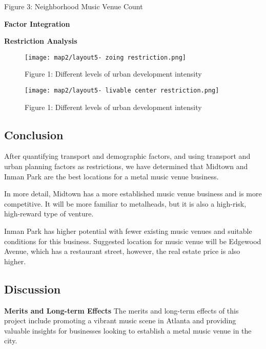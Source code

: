 \documentclass[11pt]{article}
\begin{document}
\begin{center}
\centering
Figure 3: Neighborhood Music Venue Count
\end{center}


\textbf{Factor Integration}


\textbf{Restriction Analysis}

\begin{figure}[H]
\begin{center}
\centering
\texttt{[image: map2/layout5- zoing restriction.png]}
\caption{Figure 1: Different levels of urban development intensity}
\label{fig:figure1}
\end{center}
\end{figure}

\begin{figure}[H]
\begin{center}
\centering
\texttt{[image: map2/layout5- livable center restriction.png]}
\caption{Figure 1: Different levels of urban development intensity}
\label{fig:figure1}
\end{center}
\end{figure}


\subsection{Conclusion}
After quantifying transport and demographic factors, and using transport and urban planning factors as restrictions, we have determined that Midtown and Inman Park are the best locations for a metal music venue business.

In more detail, Midtown has a more established music venue business and is more competitive. It will be more familiar to metalheads, but it is also a high-risk, high-reward type of venture.

Inman Park has higher potential with fewer existing music venues and suitable conditions for this business. Suggested location for music venue will be Edgewood Avenue, which has a restaurant street, however, the real estate price is also higher. 



\subsection{Discussion}




\textbf{Merits and Long-term Effects}
The merits and long-term effects of this project include promoting a vibrant music scene in Atlanta and providing valuable insights for businesses looking to establish a metal music venue in the city.
\end{document}
